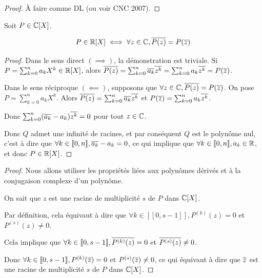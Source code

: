 \documentclass[12pt,a4paper]{report}
\begin{document}
\begin{proof}
    À faire comme DL (ou voir CNC 2007).
\end{proof}

\begin{property}
    Soit $P \in \mathbb{C}[X]$.

    $$P \in \mathbb{R}[X] \iff \forall z \in \mathbb{C}, \overline{P(z)} = P(\overline{z})$$
\end{property}

\begin{proof}
    Dans le sens direct $(\implies)$, la démonstration est triviale. Si $P = \sum_{k=0}^{n}a_kX^k \in \mathbb{R}[X]$, alors $\overline{P(z)} = \sum_{k=0}^{n}\overline{a_k}\overline{z^k} = \sum_{k=0}^{n}a_k\overline{z^k} = P(\overline{z})$.

    Dans le sens réciproque $(\impliedby)$, supposons que $\forall z \in \mathbb{C}, \overline{P(z)} = P(\overline{z})$. On pose $P = \sum_{k=0}^{n}a_kX^k$. Alors $\overline{P(z)} = \sum_{k=0}^{n}\overline{a_k}\overline{z^k}$ et $P(\overline{z}) = \sum_{k=0}^{n}a_k\overline{z^k}$.

    Donc $\sum_{k=0}^{n}(\overline{a_k} - a_k)\overline{z^k} = 0$ pour tout $z \in \mathbb{C}$.

    Donc $Q$ admet une infinité de racines, et par conséquent $Q$ est le polynôme nul, c'est à dire que $\forall k \in [\![0,n]\!], \overline{a_k} - a_k = 0$, ce qui implique que $\forall k \in [\![0,n]\!], a_k \in \mathbb{R}$, et donc $P \in \mathbb{R}[X]$.
\end{proof}

\begin{proof}
    Nous allons utiliser les propriétés liées aux polynômes dérivés et à la conjugaison complexe d'un polynôme.

    On sait que $z$ est une racine de multiplicité $s$ de $P$ dans $\mathbb{C}[X]$.

    Par définition, cela équivaut à dire que $\forall k \in [\![0,s-1]\!], P^{(k)}(z) = 0$ et $P^{(s)}(z) \ne 0$.

    Cela implique que $\forall k \in [\![0,s-1]\!], \overline{P^{(k)}(z)} = 0$ et $\overline{P^{(s)}(z)} \ne 0$.

    Donc $\forall k \in [\![0,s-1]\!], P^{(k)}(\overline{z}) = 0$ et $P^{(s)}(\overline{z}) \ne 0$, ce qui équivaut à dire que $\overline{z}$ est une racine de multiplicité $s$ de $P$ dans $\mathbb{C}[X]$.
\end{proof}
\end{document}
